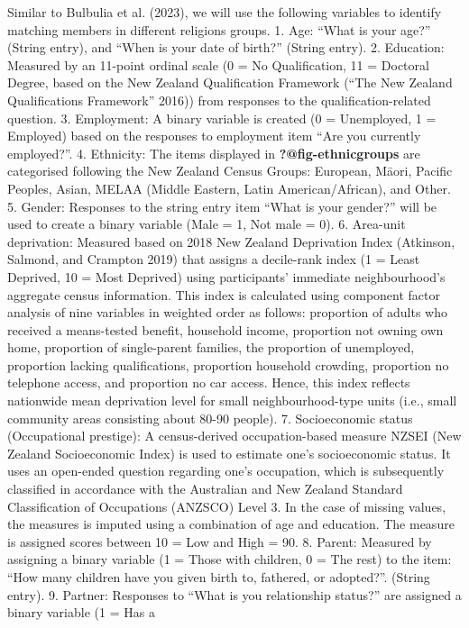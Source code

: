 \documentclass[
]{interact}
\begin{document}
Similar to Bulbulia et al. (2023), we will use the following variables
to identify matching members in different religions groups. 1. Age:
``What is your age?'' (String entry), and ``When is your date of
birth?'' (String entry). 2. Education: Measured by an 11-point ordinal
scale (0 = No Qualification, 11 = Doctoral Degree, based on the New
Zealand Qualification Framework ({``The New Zealand Qualifications
Framework''} 2016)) from responses to the qualification-related
question. 3. Employment: A binary variable is created (0 = Unemployed, 1
= Employed) based on the responses to employment item ``Are you
currently employed?''. 4. Ethnicity: The items displayed in
\textbf{?@fig-ethnicgroups} are categorised following the New Zealand
Census Groups: European, Māori, Pacific Peoples, Asian, MELAA (Middle
Eastern, Latin American/African), and Other. 5. Gender: Responses to the
string entry item ``What is your gender?'' will be used to create a
binary variable (Male = 1, Not male = 0). 6. Area-unit deprivation:
Measured based on 2018 New Zealand Deprivation Index (Atkinson, Salmond,
and Crampton 2019) that assigns a decile-rank index (1 = Least Deprived,
10 = Most Deprived) using participants' immediate neighbourhood's
aggregate census information. This index is calculated using component
factor analysis of nine variables in weighted order as follows:
proportion of adults who received a means-tested benefit, household
income, proportion not owning own home, proportion of single-parent
families, the proportion of unemployed, proportion lacking
qualifications, proportion household crowding, proportion no telephone
access, and proportion no car access. Hence, this index reflects
nationwide mean deprivation level for small neighbourhood-type units
(i.e., small community areas consisting about 80-90 people). 7.
Socioeconomic status (Occupational prestige): A census-derived
occupation-based measure NZSEI (New Zealand Socioeconomic Index) is used
to estimate one's socioeconomic status. It uses an open-ended question
regarding one's occupation, which is subsequently classified in
accordance with the Australian and New Zealand Standard Classification
of Occupations (ANZSCO) Level 3. In the case of missing values, the
measures is imputed using a combination of age and education. The
measure is assigned scores between 10 = Low and High = 90. 8. Parent:
Measured by assigning a binary variable (1 = Those with children, 0 =
The rest) to the item: ``How many children have you given birth to,
fathered, or adopted?''. (String entry). 9. Partner: Responses to ``What
is you relationship status?'' are assigned a binary variable (1 = Has a
\end{document}
